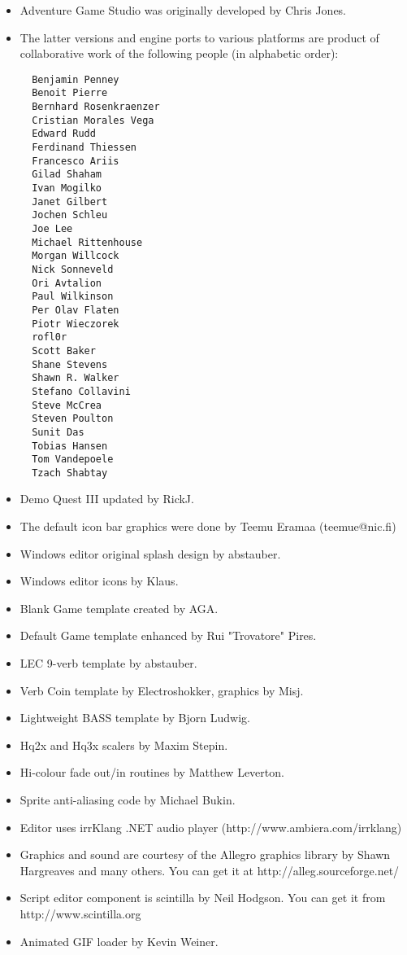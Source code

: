 \begin{itemize}
\item Adventure Game Studio was originally developed by Chris Jones.
\item The latter versions and engine ports to various platforms are product of collaborative work of the following people (in alphabetic order):
\begin{verbatim}
  Benjamin Penney
  Benoit Pierre
  Bernhard Rosenkraenzer
  Cristian Morales Vega
  Edward Rudd
  Ferdinand Thiessen
  Francesco Ariis
  Gilad Shaham
  Ivan Mogilko
  Janet Gilbert
  Jochen Schleu
  Joe Lee
  Michael Rittenhouse
  Morgan Willcock
  Nick Sonneveld
  Ori Avtalion
  Paul Wilkinson
  Per Olav Flaten
  Piotr Wieczorek
  rofl0r
  Scott Baker
  Shane Stevens
  Shawn R. Walker
  Stefano Collavini
  Steve McCrea
  Steven Poulton
  Sunit Das
  Tobias Hansen
  Tom Vandepoele
  Tzach Shabtay
\end{verbatim}
\item Demo Quest III updated by RickJ.
\item The default icon bar graphics were done by Teemu Eramaa (teemue@nic.fi)
\item Windows editor original splash design by abstauber.
\item Windows editor icons by Klaus.
\item Blank Game template created by AGA.
\item Default Game template enhanced by Rui "Trovatore" Pires.
\item LEC 9-verb template by abstauber.
\item Verb Coin template by Electroshokker, graphics by Misj.
\item Lightweight BASS template by Bjorn Ludwig.
\item Hq2x and Hq3x scalers by Maxim Stepin.
\item Hi-colour fade out/in routines by Matthew Leverton.
\item Sprite anti-aliasing code by Michael Bukin.
\item Editor uses irrKlang .NET audio player (http://www.ambiera.com/irrklang)
\item Graphics and sound are courtesy of the Allegro graphics library by Shawn
  Hargreaves and many others. You can get it at
  http://alleg.sourceforge.net/
\item Script editor component is scintilla by Neil Hodgson. You can get it from http://www.scintilla.org
\item Animated GIF loader by Kevin Weiner.

\end{itemize}
